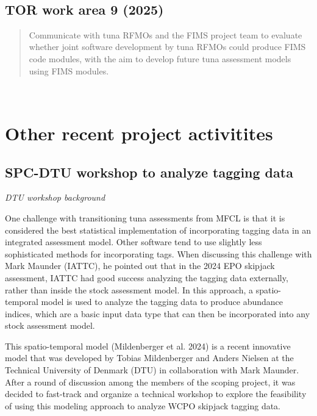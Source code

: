 \documentclass{SCreport}
\begin{document}
~

\vspace{2ex}

\subsection{TOR work area 9 (2025)}

\begin{quote}\sf
  Communicate with tuna RFMOs and the FIMS project team to evaluate whether
  joint software development by tuna RFMOs could produce FIMS code modules, with
  the aim to develop future tuna assessment models using FIMS modules.
\end{quote}

\vspace{2ex}

~

\vspace{2ex}

\section{Other recent project activitites}

\subsection{SPC-DTU workshop to analyze tagging data}
\label{sec:dtu-2025-workshop}

\textit{DTU workshop background}

One challenge with transitioning tuna assessments from MFCL is that it is
considered the best statistical implementation of incorporating tagging data in
an integrated assessment model. Other software tend to use slightly less
sophisticated methods for incorporating tags. When discussing this challenge
with Mark Maunder (IATTC), he pointed out that in the 2024 EPO skipjack
assessment, IATTC had good success analyzing the tagging data externally, rather
than inside the stock assessment model. In this approach, a spatio-temporal
model is used to analyze the tagging data to produce abundance indices, which
are a basic input data type that can then be incorporated into any stock
assessment model.

This spatio-temporal model (Mildenberger et al. 2024) is a recent innovative
model that was developed by Tobias Mildenberger and Anders Nielsen at the
Technical University of Denmark (DTU) in collaboration with Mark Maunder. After
a round of discussion among the members of the scoping project, it was decided
to fast-track and organize a technical workshop to explore the feasibility of
using this modeling approach to analyze WCPO skipjack tagging data.
\end{document}
